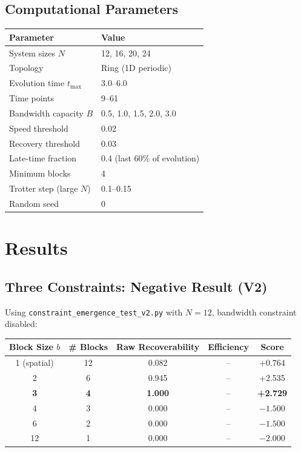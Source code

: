 \documentclass[11pt]{article}
\begin{document}
\subsection{Computational Parameters}

\begin{center}
\begin{tabular}{ll}
\toprule
Parameter & Value \\
\midrule
System sizes $N$ & 12, 16, 20, 24 \\
Topology & Ring (1D periodic) \\
Evolution time $t_{\max}$ & 3.0--6.0 \\
Time points & 9--61 \\
Bandwidth capacity $B$ & 0.5, 1.0, 1.5, 2.0, 3.0 \\
Speed threshold & 0.02 \\
Recovery threshold & 0.03 \\
Late-time fraction & 0.4 (last 60\% of evolution) \\
Minimum blocks & 4 \\
Trotter step (large $N$) & 0.1--0.15 \\
Random seed & 0 \\
\bottomrule
\end{tabular}
\end{center}

\section{Results}

\subsection{Three Constraints: Negative Result (V2)}

Using \texttt{constraint\_emergence\_test\_v2.py} with $N=12$, bandwidth constraint 
disabled:

\begin{center}
\begin{tabular}{ccccc}
\toprule
Block Size $b$ & \# Blocks & Raw Recoverability & Efficiency & Score \\
\midrule
1 (spatial) & 12 & 0.082 & -- & +0.764 \\
2 & 6 & 0.945 & -- & +2.535 \\
\textbf{3} & \textbf{4} & \textbf{1.000} & -- & \textbf{+2.729} \\
4 & 3 & 0.000 & -- & $-1.500$ \\
6 & 2 & 0.000 & -- & $-1.500$ \\
12 & 1 & 0.000 & -- & $-2.000$ \\
\bottomrule
\end{tabular}
\end{center}
\end{document}
